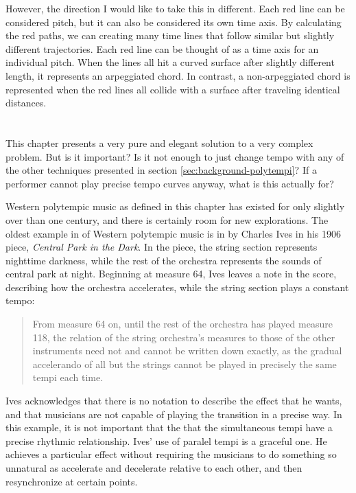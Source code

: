 However, the direction I would like to take this in different. Each
red line can be considered pitch, but it can also be considered its
own time axis. By calculating the red paths, we can creating many time
lines that follow similar but slightly different trajectories. Each
red line can be thought of as a time axis for an individual
pitch. When the lines all hit a curved surface after slightly
different length, it represents an arpeggiated chord. In contrast, a
non-arpeggiated chord is represented when the red lines all collide
with a surface after traveling identical distances.


\section{\polytempic}
This chapter presents a very pure and elegant solution to a very
complex problem. But is it important? Is it not enough to just change
tempo with any of the other techniques presented in section
\ref{sec:background-polytempi}? If a performer cannot play precise tempo
curves anyway, what is this actually for?

Western polytempic music as defined in this chapter has existed for
only slightly over than one century, and there is certainly room for
new explorations. The oldest example in of Western polytempic music is
in by Charles Ives in his 1906 piece, \textit{Central Park in the
  Dark}.\cite{Greschak2003} In the piece, the string section
represents nighttime darkness, while the rest of the orchestra
represents the sounds of central park at night. Beginning at measure
64, Ives leaves a note in the score, describing how the orchestra
accelerates, while the string section plays a constant tempo:
\begin{quotation}
  From measure 64 on, until the rest of the orchestra has played
  measure 118, the relation of the string orchestra's measures to
  those of the other instruments need not and cannot be written down
  exactly, as the gradual accelerando of all but the strings cannot be
  played in precisely the same tempi each time.
\end{quotation}
Ives acknowledges that there is no notation to describe the effect
that he wants, and that musicians are not capable of playing the
transition in a precise way. In this example, it is not important that
the that the simultaneous tempi have a precise rhythmic
relationship. Ives' use of paralel tempi is a graceful one. He
achieves a particular effect without requiring the musicians to do
something so unnatural as accelerate and decelerate relative to each
other, and then resynchronize at certain points. 

